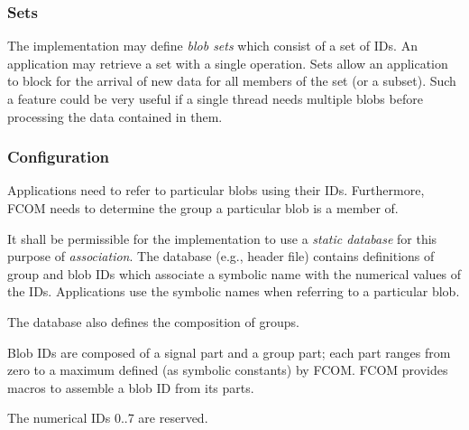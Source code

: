 \documentclass[11pt]{article}
\newcommand{\fcom}{FCOM}
\newcommand{\blob}{blob}
\newcommand{\Blob}{Blob}
\newcommand{\group}{group}
\newcommand{\signal}{signal}
\newcommand{\set}{set}
\newcommand{\Set}{Set}
\begin{document}
	\subsubsection{Sets}
                    The implementation may define {\em blob sets}\/
                    which consist of a set of IDs. An application may
                    retrieve a \set{} with a single operation. \Set{}s allow
                    an application to block for the arrival of new data
                    for all members of the \set{} (or a subset).
                    Such a feature could be very useful if a single
                    thread needs multiple \blob{}s before processing
                    the data contained in them.

	\subsubsection{Configuration}
		Applications need to refer to particular \blob{}s using
        their IDs. Furthermore, \fcom{} needs to determine
        the \group{} a particular \blob{} is a member of.

        It shall be permissible for the implementation
        to use a {\em static database} for this purpose
        of {\em association}. The database (e.g., header file)
        contains definitions of \group{} and \blob{} IDs
        which associate a symbolic name with the numerical
        values of the IDs. Applications use the symbolic
        names when referring to a particular \blob{}.

        The database also defines the composition of \group{}s.

        \Blob{} IDs are composed of a \signal{} part and a \group{}
        part; each part ranges from zero to a maximum defined
        (as symbolic constants) by \fcom. \fcom{} provides
        macros to assemble a \blob{} ID from its parts.

        The numerical IDs 0..7 are reserved.
        
\end{document}
